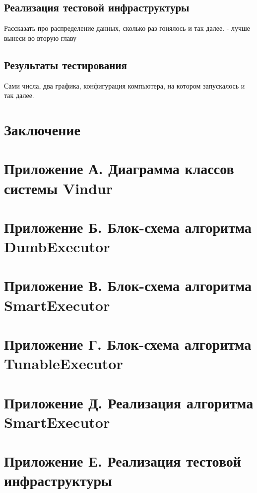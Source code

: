 \documentclass{matmex-diploma}
\begin{document}
    \subsection{Реализация тестовой инфраструктуры}
        Рассказать про распределение данных, сколько раз гонялось и так далее. - лучше вынеси во вторую главу
    \subsection{Результаты тестирования}
        Сами числа, два графика, конфигурация компьютера, на котором запускалось и так далее.
    
\section*{Заключение}



\section*{Приложение А. Диаграмма классов системы Vindur}
\section*{Приложение Б. Блок-схема алгоритма DumbExecutor}
\section*{Приложение В. Блок-схема алгоритма SmartExecutor}
\section*{Приложение Г. Блок-схема алгоритма TunableExecutor}
\section*{Приложение Д. Реализация алгоритма SmartExecutor}
    
\section*{Приложение Е. Реализация тестовой инфраструктуры}
    
\end{document}
